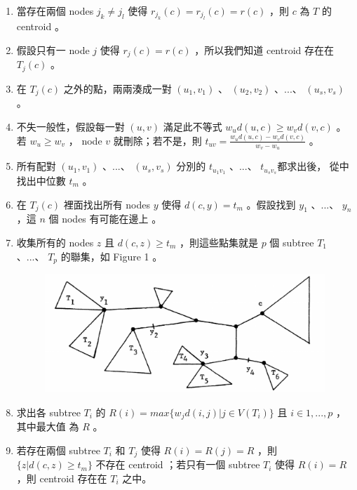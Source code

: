 \documentclass[12pt]{article}
\begin{document}
\begin{CJK}{UTF8}{bkai}
\begin{enumerate}
\item 當存在兩個 nodes $j_k \neq  j_l$ 使得 $r_{j_k}(c)=r_{j_l}(c)=r(c)$ ，則 $c$ 為 $T$ 的
 centroid 。

\item 假設只有一 node $j$ 使得 $r_{j}(c)=r(c)$ ，所以我們知道 centroid 存在在 $T_j(c)$ 。

\item 在 $T_j(c)$ 之外的點，兩兩湊成一對 $(u_1,v_1)$ 、 $(u_2,v_2)$ 、...、 $(u_s,v_s)$ 。

\item 不失一般性，假設每一對 $(u,v)$ 滿足此不等式 $w_ud(u,c) \geq w_vd(v,c)$ 。若 $w_u \geq w_v$
， node $v$ 就刪除；若不是，則 $t_{uv}=\frac{w_ud(u,c)-w_vd(v,c)}{w_v-w_u}$ 。

\item 所有配對 $(u_1,v_1)$ 、...、 $(u_s,v_s)$ 分別的 $t_{u_1v_1}$ 、...、 $t_{u_sv_s}$都求出後，
從中找出中位數 $t_m$ 。

\item 在 $T_j(c)$ 裡面找出所有 nodes $y$ 使得 $d(c,y)=t_m$ 。假設找到 $y_1$ 、...、 $y_n$ ，這
$n$ 個 nodes 有可能在邊上 。

\item 收集所有的 nodes $z$ 且 $d(c,z)\geq t_m$ ，則這些點集就是 $p$ 個 subtree $T_1$ 、...、 $T_p$
 的聯集，如 Figure 1 。

\begin{figure}[H]
\centering
\includegraphics[scale=0.3]{fig1.eps}
\caption{}
\end{figure}

\item 求出各 subtree $T_i$ 的 $R(i)=max\{w_jd(i,j)|j \in V(T_i)\}$ 且 $i \in {1,...,p}$ ，其中最大值
為 $R$ 。

\item 若存在兩個 subtree $T_i$ 和 $T_j$ 使得 $R(i)=R(j)=R$ ，則 $\{z|d(c,z)\geq t_m\}$ 不存在 centroid
；若只有一個 subtree $T_i$ 使得 $R(i)=R$，則 centroid 存在在 $T_i$ 之中。


\end{enumerate}
\end{CJK}
\end{document}
